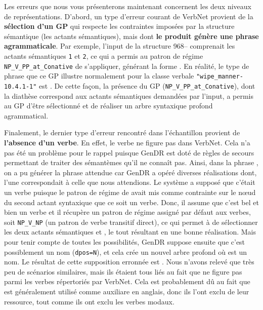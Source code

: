 Les erreurs que nous vous présenterons maintenant concernent les deux niveaux de représentations. D'abord, un type d'erreur courant de VerbNet provient de la \textbf{sélection d'un \ac{GP}} qui respecte les contraintes imposées par la structure sémantique (les actants sémantiques), mais dont \textbf{le produit génère une phrase agrammaticale}. Par exemple, l'input de la structure 968-- comprenait les actants sémantiques \texttt{1} et \texttt{2}, ce qui a permis au patron de régime \texttt{NP\_V\_PP\_at\_Conative} de s'appliquer, générant la forme \ungr{}. En réalité, le type de phrase que ce \ac{GP} illustre normalement pour la classe verbale \texttt{"wipe\_manner-10.4.1-1"} est . De cette façon, la présence du \ac{GP} (\texttt{NP\_V\_PP\_at\_Conative}), dont la diathèse correspond aux actants sémantiques demandées par l'input, a permis au \ac{GP} d'être sélectionné et de réaliser un arbre syntaxique profond agrammatical.

Finalement, le dernier type d'erreur rencontré dans l'échantillon provient de \textbf{l'absence d'un verbe}. En effet, le verbe  ne figure pas dans VerbNet. Cela n'a pas été un problème pour le rappel puisque GenDR est doté de règles de secours permettant de traiter des sémantèmes qu'il ne connaît pas. Ainsi, dans la phrase , on a pu générer la phrase attendue car GenDR a opéré diverses réalisations dont, l'une correspondait à celle que nous attendions. Le système a supposé que c'était un verbe puisque le patron de régime de  avait mis comme contrainte sur le n\oe{}ud du second actant syntaxique que ce soit un verbe. Donc, il assume que c'est bel et bien un verbe et il récupère un patron de régime assigné par défaut aux verbes, soit \texttt{NP\_V\_NP} (un patron de verbe transitif direct), ce qui permet à  de sélectionner les deux actants sémantiques  et , le tout résultant en une bonne réalisation. Mais pour tenir compte de toutes les possibilités, GenDR suppose ensuite que c'est possiblement un nom (\texttt{dpos=N}), et cela crée un nouvel arbre profond où  est un nom. Le résultat de cette supposition erronnée est \ungr{}. Nous n'avons relevé que très peu de scénarios similaires, mais ils étaient tous liés au fait que  ne figure pas parmi les verbes répertoriés par VerbNet. Cela est probablement dû au fait que  est généralement utilisé comme auxiliare en anglais, donc ils l'ont exclu de leur ressource, tout comme ils ont exclu les verbes modaux.

